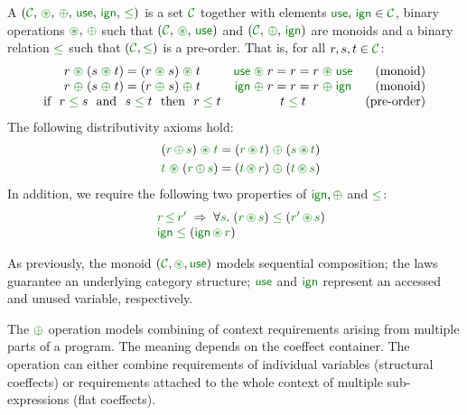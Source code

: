 \begin{definition}
A \emph{} $(\C, \,\cseq, \,\cpar, \,\cunit, \,\czero, \,\cleq)$ is a set
$\C$ together with elements $\cunit, \,\czero \in \C$, binary operations $\cseq, \,\cpar$ such that
$(\C, \,\cseq, \,\cunit)$ and $(\C, \,\cpar, \,\czero)$ are monoids and a binary relation $\cleq$ such
that $(\C, \cleq)$ is a pre-order. That is, for all $r,s,t\in \C$:
%
\begin{equation*}
\begin{array}{ccr}
r \;\cseq\; (s \;\cseq\; t) = (r \;\cseq\; s) \;\cseq\; t  &
\cunit \;\cseq\; r = r = r \;\cseq\; \cunit &
\textnormal{(monoid)}
\\
r \;\cpar\; (s \;\cpar\; t) = (r \;\cpar\; s) \;\cpar\; t &
\czero \;\cpar\; r = r = r \;\cpar\; \czero &
\textnormal{(monoid)}
\\
\textnormal{if}~~r\; \cleq\; s ~~\textnormal{and}~~s\; \cleq\; t~~\textnormal{then}~~r\; \cleq\; t&
t\; \cleq\; t &
\textnormal{(pre-order)}
\\
\end{array}
\end{equation*}
%
The following distributivity axioms hold:
\begin{align*}
\quad (\cclrd{r}\, \cpar\, \cclrd{s}) \;\cseq\; \cclrd{t} & = (\cclrd{r} \,\cseq\, \cclrd{t}) \;\cpar\; (\cclrd{s}\, \cseq\, \cclrd{t}) \\
\quad \cclrd{t} \;\cseq\; (\cclrd{r}\, \cpar\, \cclrd{s}) & = (\cclrd{t} \,\cseq\, \cclrd{r}) \;\cpar\; (\cclrd{t}\, \cseq\, \cclrd{s})
\end{align*}
%
In addition, we require the following two properties of $\czero, \cpar$ and $\cleq$:
\begin{equation*}
\begin{array}{l}
 \quad \cclrd{r}\,\cleq\,\cclrd{r'} \; \Rightarrow \; \forall\cclrd{s}.\;(\cclrd{r}\,\cseq\,\cclrd{s})\;\cleq\;(\cclrd{r'}\,\cseq\,\cclrd{s}) \\
 \quad \czero\;\cleq\;(\czero\,\cseq\,\cclrd{r})
\end{array}
\end{equation*}
\end{definition}

\noindent
As previously, the monoid $(\C,\cseq,\cunit)$ models sequential composition; the laws guarantee
an underlying category structure; $\cunit$ and $\czero$ represent an accessed and unused variable,
respectively.

The $\cpar$ operation models combining of context requirements arising from multiple parts of a
program. The meaning depends on the coeffect container. The operation can either combine requirements
of individual variables (structural coeffects) or requirements attached to the whole context of
multiple sub-exp\-ressions (flat coeffects).

